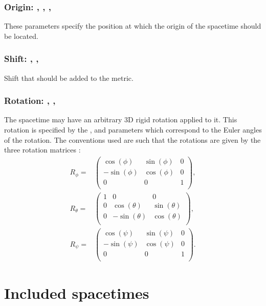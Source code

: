 \documentclass{article}
\begin{document}
\subsubsection{Origin: , , , }
These parameters specify the position at which the origin of the spacetime
should be located.

\subsubsection{Shift: , , }
Shift that should be added to the metric.

\subsubsection{Rotation: , , }
The spacetime may have an arbitrary $3$D rigid rotation applied to it. This
rotation is specified by the ,  and  parameters
which correspond to the Euler angles of the rotation. The conventions used are
such that the rotations are given by the three rotation matrices \cite{EinsteinExact_Euler}:
\begin{align}
R_\phi =& 
\left(
\begin{array}{ccc}
 \cos (\phi ) & \sin (\phi ) & 0 \\
 -\sin (\phi ) & \cos (\phi ) & 0 \\
 0 & 0 & 1 \\
\end{array}
\right), \nonumber \\
R_\theta =&
\left(
\begin{array}{ccc}
 1 & 0 & 0 \\
 0 & \cos (\theta ) & \sin (\theta ) \\
 0 & -\sin (\theta ) & \cos (\theta ) \\
\end{array}
\right), \nonumber \\
R_\psi =&
\left(
\begin{array}{ccc}
 \cos (\psi ) & \sin (\psi ) & 0 \\
 -\sin (\psi ) & \cos (\psi ) & 0 \\
 0 & 0 & 1 \\
\end{array}
\right).
\end{align}

\section{Included spacetimes}
\end{document}
